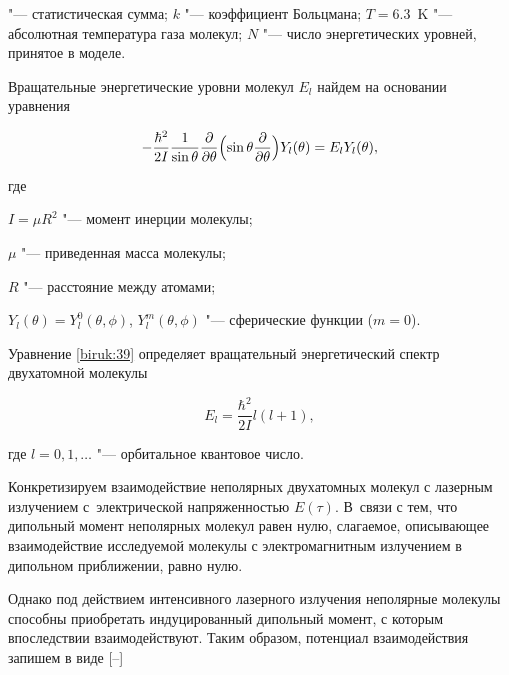 "--- статистическая сумма; $k$ "--- коэффициент Больцмана; $T=6.3$~K "--- абсолютная температура газа молекул; $N$ "--- число энергетических уровней, принятое в моделе.



Вращательные энергетические уровни молекул $E_{l}$ найдем на основании уравнения


\cite{biruk:Landau_89}

\begin{equation}

-\frac{\hbar^2}{2I}\frac{1}{\sin{\theta}}\frac{\partial}{\partial \theta}\Bigl(\sin{\theta}\frac{\partial}{\partial \theta}\Bigr)Y_l(\theta)=E_{l}Y_l(\theta), 

\label{biruk:39}

\end{equation}

где 

$I=\mu R^2$ "--- момент инерции молекулы; 

$\mu$ "--- приведенная масса молекулы; 

$R$ "--- расстояние между атомами;

 $Y_l(\theta)=Y_l^0(\theta,\phi)$, $Y_l^m(\theta,\phi)$ "--- сферические функции ($m=0$).



Уравнение \eqref{biruk:39} определяет вращательный энергетический спектр двухатомной молекулы

\begin{equation}

E_l= \frac{\hbar^2}{2I}l(l+1), 

\label{biruk:40}

\end{equation}

где $l=0, 1,\dots $ "--- орбитальное квантовое число.



Конкретизируем взаимодействие неполярных двухатомных молекул с лазерным излучением с~электрической напряженностью $E(\tau)$. В~связи с тем, что дипольный момент неполярных молекул равен нулю, слагаемое, описывающее взаимодействие исследуемой молекулы с электромагнитным излучением в дипольном приближении, равно нулю. 

Однако под действием интенсивного лазерного излучения неполярные молекулы способны приобретать индуцированный дипольный момент, с которым впоследствии взаимодействуют. Таким образом, потенциал взаимодействия запишем в виде [--]

